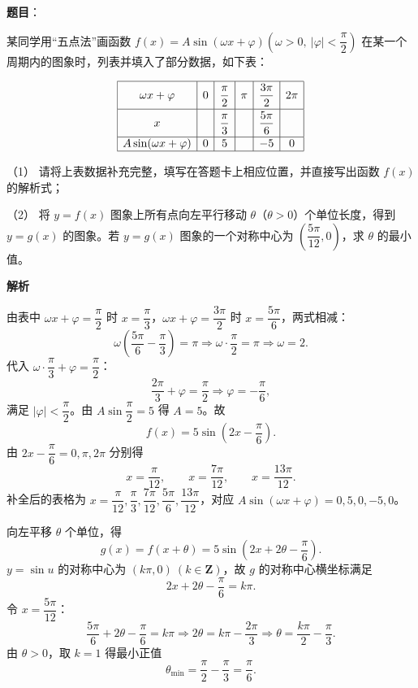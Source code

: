 \begin{answer}

\textbf{题目}：

某同学用“五点法”画函数 \(f(x)=A\sin(\omega x+\varphi)\left(\omega>0,\ |\varphi|<\dfrac{\pi}{2}\right)\) 在某一个周期内的图象时，列表并填入了部分数据，如下表：

\nopagebreak[4]
\[
\begin{array}{|c|c|c|c|c|c|}
\hline
\rule{0pt}{1.5em}\omega x+\varphi & 0 & \dfrac{\pi}{2} & \pi & \dfrac{3\pi}{2} & 2\pi\\[0.55em]
\hline
\rule{0pt}{1.5em}x & & \dfrac{\pi}{3} & & \dfrac{5\pi}{6} & \\[0.55em]
\hline
A\sin(\omega x+\varphi) & 0 & 5 & & -5 & 0\\
\hline
\end{array}
\]

（1） 请将上表数据补充完整，填写在答题卡上相应位置，并直接写出函数 \(f(x)\) 的解析式；

（2） 将 \(y=f(x)\) 图象上所有点向左平行移动 \(\theta\)（\(\theta>0\)）个单位长度，得到 \(y=g(x)\) 的图象。若 \(y=g(x)\) 图象的一个对称中心为 \(\left(\dfrac{5\pi}{12},0\right)\)，求 \(\theta\) 的最小值。

\textbf{解析}


由表中 \(\omega x+\varphi=\dfrac{\pi}{2}\) 时 \(x=\dfrac{\pi}{3}\)，\(\omega x+\varphi=\dfrac{3\pi}{2}\) 时 \(x=\dfrac{5\pi}{6}\)，两式相减：
\nopagebreak[4]
\[
\omega\left(\dfrac{5\pi}{6}-\dfrac{\pi}{3}\right)=\pi
\Longrightarrow
\omega\cdot\dfrac{\pi}{2}=\pi
\Longrightarrow
\omega=2.
\]
代入 \(\omega\cdot\dfrac{\pi}{3}+\varphi=\dfrac{\pi}{2}\)：
\nopagebreak[4]
\[
\dfrac{2\pi}{3}+\varphi=\dfrac{\pi}{2}
\Longrightarrow
\varphi=-\dfrac{\pi}{6},
\]
满足 \(|\varphi|<\dfrac{\pi}{2}\)。由 \(A\sin\dfrac{\pi}{2}=5\) 得 \(A=5\)。故
\nopagebreak[4]
\[
f(x)=5\sin\left(2x-\dfrac{\pi}{6}\right).
\]
由 \(2x-\dfrac{\pi}{6}=0,\pi,2\pi\) 分别得
\nopagebreak[4]
\[
x=\dfrac{\pi}{12},\qquad x=\dfrac{7\pi}{12},\qquad x=\dfrac{13\pi}{12}.
\]
补全后的表格为 \(x=\dfrac{\pi}{12},\dfrac{\pi}{3},\dfrac{7\pi}{12},\dfrac{5\pi}{6},\dfrac{13\pi}{12}\)，对应 \(A\sin(\omega x+\varphi)=0,5,0,-5,0\)。


向左平移 \(\theta\) 个单位，得
\nopagebreak[4]
\[
g(x)=f(x+\theta)=5\sin\left(2x+2\theta-\dfrac{\pi}{6}\right).
\]
\(y=\sin u\) 的对称中心为 \((k\pi,0)\ (k\in\mathbf{Z})\)，故 \(g\) 的对称中心横坐标满足
\nopagebreak[4]
\[
2x+2\theta-\dfrac{\pi}{6}=k\pi.
\]
令 \(x=\dfrac{5\pi}{12}\)：
\nopagebreak[4]
\[
\dfrac{5\pi}{6}+2\theta-\dfrac{\pi}{6}=k\pi
\Longrightarrow
2\theta=k\pi-\dfrac{2\pi}{3}
\Longrightarrow
\theta=\dfrac{k\pi}{2}-\dfrac{\pi}{3}.
\]
由 \(\theta>0\)，取 \(k=1\) 得最小正值
\nopagebreak[4]
\[
\theta_{\min}=\dfrac{\pi}{2}-\dfrac{\pi}{3}=\dfrac{\pi}{6}.
\]


\end{answer}
